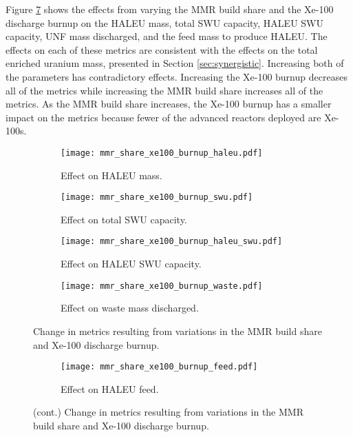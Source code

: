 Figure \ref{fig:mmr_share_xe100_burnup} shows the effects from varying 
the \gls{MMR} build share and the Xe-100 discharge burnup on the 
\gls{HALEU} mass, total \gls{SWU} capacity, \gls{HALEU} \gls{SWU} 
capacity, \gls{UNF} mass discharged, and the feed mass to produce \gls{HALEU}. 
The effects on each of these metrics are consistent with the effects on 
the total enriched uranium mass, presented in Section \ref{sec:synergistic}.
Increasing both of the parameters has contradictory effects. Increasing the 
Xe-100 burnup decreases all of the metrics while increasing the \gls{MMR} 
build share increases all of the metrics. As the \gls{MMR} build share 
increases, the Xe-100 burnup has a smaller impact on the metrics because 
fewer of the advanced reactors deployed are Xe-100s. 


\begin{figure}
    \begin{subfigure}[h!]{0.48\textwidth}
        \centering
        \texttt{[image: mmr\_share\_xe100\_burnup\_haleu.pdf]}
        \caption{Effect on HALEU mass.}
        \label{fig:mmr_share_xe100_burnup_haleu}
    \end{subfigure}
    \hfill 
    \begin{subfigure}[h!]{0.48\textwidth}
        \centering
        \texttt{[image: mmr\_share\_xe100\_burnup\_swu.pdf]}
        \caption{Effect on total SWU capacity.}
        \label{fig:mmr_share_xe100_burnup_swu}
    \end{subfigure}
    \hfill
    \begin{subfigure}[h!]{0.48\textwidth}
        \centering
        \texttt{[image: mmr\_share\_xe100\_burnup\_haleu\_swu.pdf]}
        \caption{Effect on HALEU SWU capacity.}
        \label{fig:mmr_share_xe100_burnup_haleu_swu}
    \end{subfigure}
    \hfill
    \begin{subfigure}[h!]{0.48\textwidth}
        \centering
        \texttt{[image: mmr\_share\_xe100\_burnup\_waste.pdf]}
        \caption{Effect on waste mass discharged.}
        \label{fig:mmr_share_xe100_burnup_waste}
    \end{subfigure}
    \caption{Change in metrics resulting from variations in the 
    MMR build share and Xe-100 discharge burnup.}
\end{figure}

\begin{figure}
    \ContinuedFloat
    \begin{subfigure}[h!]{0.48\textwidth}
        \centering
        \texttt{[image: mmr\_share\_xe100\_burnup\_feed.pdf]}
        \caption{Effect on HALEU feed.}
        \label{fig:mmr_share_xe100_burnup_feed}
    \end{subfigure}
    \caption{(cont.) Change in metrics resulting from variations in the 
    MMR build share and Xe-100 discharge burnup.}
    \label{fig:mmr_share_xe100_burnup}
\end{figure}

